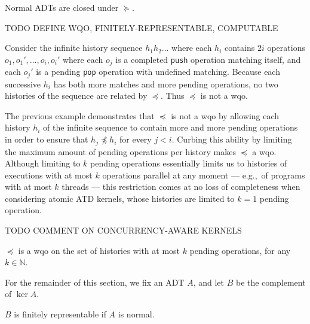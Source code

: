 \begin{lemma}

  Normal ADTs are closed under $\succeq$.

\end{lemma}

TODO DEFINE WQO, FINITELY-REPRESENTABLE, COMPUTABLE

\begin{example}

  Consider the infinite history sequence $h_1 h_2 \ldots$ where each $h_i$
  contains $2i$ operations $o_1, o_1', \ldots, o_i, o_i'$ where each $o_j$ is a
  completed {\tt push} operation matching itself, and each $o_j'$ is a pending
  {\tt pop} operation with undefined matching. Because each successive $h_i$
  has both more matches and more pending operations, no two histories of the
  sequence are related by $\preceq$. Thus $\preceq$ is not a wqo.

\end{example}

The previous example demonstrates that $\preceq$ is not a wqo by allowing each
history $h_i$ of the infinite sequence to contain more and more pending
operations in order to ensure that $h_j \not\preceq h_i$ for every $j < i$.
Curbing this ability by limiting the maximum amount of pending operations per
history makes $\preceq$ a wqo. Although limiting to $k$ pending operations
essentially limits us to histories of executions with at most $k$ operations
parallel at any moment — e.g.,~of programs with at most $k$ threads — this
restriction comes at no loss of completeness when considering atomic ATD
kernels, whose histories are limited to $k\!=\!1$ pending operation.

TODO COMMENT ON CONCURRENCY-AWARE KERNELS

\begin{lemma}

  $\preceq$ is a wqo on the set of histories with at most $k$ pending
  operations, for any $k \in \mathbb{N}$.

\end{lemma}

For the remainder of this section, we fix an ADT $A$, and let $B$ be the
complement of $\ker A$.

\begin{lemma}

  $B$ is finitely representable if $A$ is normal.

\end{lemma}

